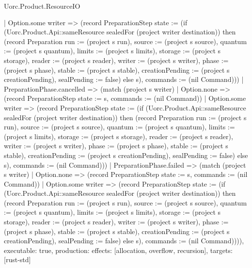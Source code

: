 \begin{lexlean}{Uorc.Product.ResourceIO}
\begin{semanticmodule}
{      | Option.some writer => (record PreparationStep {state := (if (Uorc.Product.Api::sameResource sealedFor (project writer destination)) then (record Preparation {run := (project s run), source := (project s source), quantum := (project s quantum), limits := (project s limits), storage := (project s storage), reader := (project s reader), writer := (project s writer), phase := (project s phase), stable := (project s stable), creationPending := (project s creationPending), sealPending := false}) else s), commands := (nil Command)}))
    | PreparationPhase.cancelled => (match (project s writer)
      | Option.none => (record PreparationStep {state := s, commands := (nil Command)})
      | Option.some writer => (record PreparationStep {state := (if (Uorc.Product.Api::sameResource sealedFor (project writer destination)) then (record Preparation {run := (project s run), source := (project s source), quantum := (project s quantum), limits := (project s limits), storage := (project s storage), reader := (project s reader), writer := (project s writer), phase := (project s phase), stable := (project s stable), creationPending := (project s creationPending), sealPending := false}) else s), commands := (nil Command)}))
    | PreparationPhase.failed => (match (project s writer)
      | Option.none => (record PreparationStep {state := s, commands := (nil Command)})
      | Option.some writer => (record PreparationStep {state := (if (Uorc.Product.Api::sameResource sealedFor (project writer destination)) then (record Preparation {run := (project s run), source := (project s source), quantum := (project s quantum), limits := (project s limits), storage := (project s storage), reader := (project s reader), writer := (project s writer), phase := (project s phase), stable := (project s stable), creationPending := (project s creationPending), sealPending := false}) else s), commands := (nil Command)}))),
  executable: true,
  production: {effects: [allocation, overflow, recursion], targets: [rust-std]}
}


\end{semanticmodule}
\end{lexlean}
